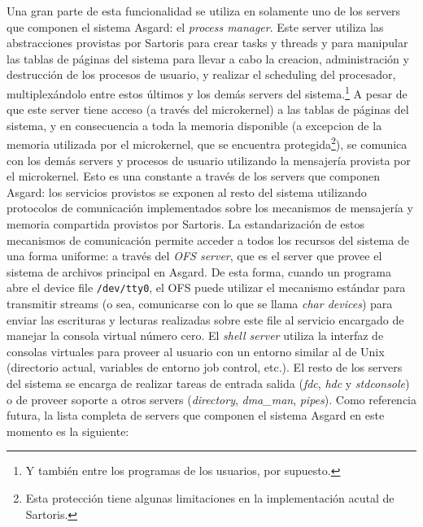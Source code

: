 \documentclass[11pt, letterpaper, twoside]{book}
\begin{document}
Una gran parte de esta funcionalidad se utiliza en solamente uno de los servers que componen el sistema Asgard: el \emph{process manager}. Este server utiliza las abstracciones provistas por Sartoris para crear tasks y threads y para manipular las tablas de p\'aginas del sistema para llevar a cabo la creacion, administraci\'on y destrucci\'on de los procesos de usuario, y realizar el scheduling del procesador, multiplex\'andolo entre estos \'ultimos y los dem\'as servers del sistema.\footnote{Y tambi\'en entre los programas de los usuarios, por supuesto.} A pesar de que este server tiene acceso (a trav\'es del microkernel) a las tablas de p\'aginas del sistema, y en consecuencia a toda la memoria disponible (a excepcion de la memoria utilizada por el microkernel, que se encuentra protegida\footnote{Esta protecci\'on tiene algunas limitaciones en la implementaci\'on acutal de Sartoris.}), se comunica con los dem\'as servers y procesos de usuario utilizando la mensajer\'ia provista por el microkernel. Esto es una constante a trav\'es de los servers que componen Asgard: los servicios provistos se exponen al resto del sistema utilizando protocolos de comunicaci\'on implementados sobre los mecanismos de mensajer\'ia y memoria compartida provistos por Sartoris. La estandarizaci\'on de estos mecanismos de comunicaci\'on permite acceder a todos los recursos del sistema de una forma uniforme: a trav\'es del \emph{OFS server}, que es el server que provee el sistema de archivos principal en Asgard. De esta forma, cuando un programa abre el device file \texttt{/dev/tty0}, el OFS puede utilizar el mecanismo est\'andar para transmitir streams (o sea, comunicarse con lo que se llama \emph{char devices}) para enviar las escrituras y lecturas realizadas sobre este file al servicio encargado de manejar la consola virtual n\'umero cero. El \emph{shell server} utiliza la interfaz de consolas virtuales para proveer al usuario con un entorno similar al de Unix (directorio actual, variables de entorno job control, etc.). El resto de los servers del sistema se encarga de realizar tareas de entrada salida (\emph{fdc}, \emph{hdc} y \emph{stdconsole}) o de proveer soporte a otros servers (\emph{directory}, \emph{dma\_man}, \emph{pipes}). Como referencia futura, la lista completa de servers que componen el sistema Asgard en este momento es la siguiente:

\vspace{0.7cm}
\end{document}
